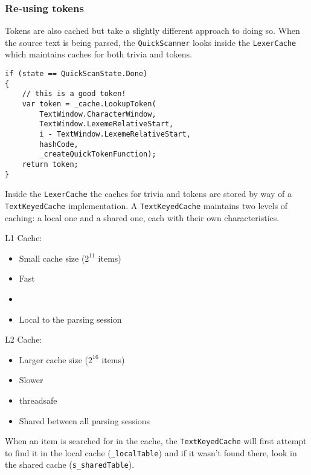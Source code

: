 \subsubsection{Re-using tokens}
\label{sec:re-use-tokens}

Tokens are also cached but take a slightly different approach to doing so. When the source text is being parsed, the \texttt{QuickScanner} looks inside the \texttt{LexerCache} which maintains caches for both trivia and tokens.

\begin{lstlisting}
if (state == QuickScanState.Done)
{
	// this is a good token!
	var token = _cache.LookupToken(
	    TextWindow.CharacterWindow,
	    TextWindow.LexemeRelativeStart,
	    i - TextWindow.LexemeRelativeStart,
	    hashCode,
	    _createQuickTokenFunction);
	return token;
}
\end{lstlisting}

Inside the \texttt{LexerCache} the caches for trivia and tokens are stored by way of a \texttt{TextKeyedCache} implementation. A \texttt{TextKeyedCache} maintains two levels of caching: a local one and a shared one, each with their own characteristics.

\noindent L1 Cache:

\begin{itemize}
\item Small cache size ($2^{11}$ items)
\item Fast
\item {}
\item Local to the parsing session
\end{itemize}

\noindent L2 Cache:

\begin{itemize}
\item Larger cache size ($2^{16}$ items)
\item Slower
\item \Gls{threadsafe}
\item Shared between all parsing sessions
\end{itemize}

\noindent When an item is searched for in the cache, the \texttt{TextKeyedCache} will first attempt to find it in the local cache (\texttt{\_localTable}) and if it wasn't found there, look in the shared cache (\texttt{s\_sharedTable}).

